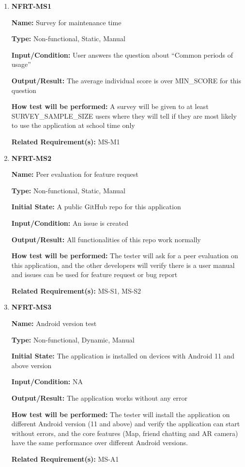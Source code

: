 \documentclass[12pt, titlepage]{article}
\begin{document}
\begin{enumerate}
\item{\textbf{NFRT-MS1}}

\textbf{Name:} Survey for maintenance time

\textbf{Type:} Non-functional, Static, Manual

\textbf{Input/Condition:} User answers the question about ``Common periods of usage''

\textbf{Output/Result:} The average individual score is over MIN\_SCORE for this question

\textbf{How test will be performed:} A survey will be given to at least SURVEY\_SAMPLE\_SIZE users where they will tell if they are most likely to use the application at school time only

\textbf{Related Requirement(s):} MS-M1

\item{\textbf{NFRT-MS2}}

\textbf{Name:} Peer evaluation for feature request

\textbf{Type:} Non-functional, Static, Manual
					
\textbf{Initial State:} A public GitHub repo for this application

\textbf{Input/Condition:} An issue is created

\textbf{Output/Result:} All functionalities of this repo work normally

\textbf{How test will be performed:} The tester will ask for a peer evaluation on this application, and the other developers will verify there is a user manual and issues can be used for feature request or bug report

\textbf{Related Requirement(s):} MS-S1, MS-S2

\item{\textbf{NFRT-MS3}}

\textbf{Name:} Android version test

\textbf{Type:} Non-functional, Dynamic, Manual
					
\textbf{Initial State:} The application is installed on devices with Android 11 and above version

\textbf{Input/Condition:} NA

\textbf{Output/Result:} The application works without any error

\textbf{How test will be performed:} The tester will install the application on different Android version (11 and above) and verify the application can start without errors, and the core features (Map, friend chatting and AR camera) have the same performance over different Android versions.

\textbf{Related Requirement(s):} MS-A1
\end{enumerate}
\end{document}
